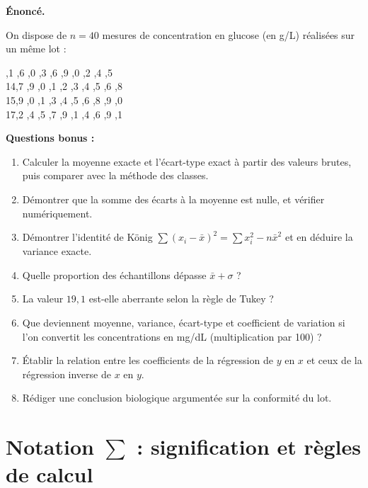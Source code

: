 \documentclass[11pt,a4paper]{article}
\newenvironment{enonce}
  {\par\medskip\begin{center}%
   \begin{lrbox}{\enoncebox}%
   \begin{minipage}{0.9\textwidth}%
   \textbf{Énoncé.}\ \itshape\par\smallskip}
  {\end{minipage}%
   \end{lrbox}%
   \setlength{\fboxsep}{10pt}%
   \colorbox{encadre}{\usebox{\enoncebox}}%
   \end{center}\par\medskip}
\begin{document}
\begin{enonce}
On dispose de \( n = 40 \) mesures de concentration en glucose
(en g/L) réalisées sur un même lot :

\smallskip
{},1 ,6 ,0 ,3 ,6 ,9 ,0 ,2 ,4 ,5 \\
14,7 ,9 ,0 ,1 ,2 ,3 ,4 ,5 ,6 ,8 \\
15,9 ,0 ,1 ,3 ,4 ,5 ,6 ,8 ,9 ,0 \\
17,2 ,4 ,5 ,7 ,9 ,1 ,4 ,6 ,9 ,1

\smallskip
\noindent\textbf{Questions bonus :}
\begin{enumerate}[label=\textbf{C.\arabic*.}, leftmargin=*]
  \item Calculer la moyenne exacte et l'écart-type exact à partir
        des valeurs brutes, puis comparer avec la méthode des classes.
  \item Démontrer que la somme des écarts à la moyenne est nulle,
        et vérifier numériquement.
  \item Démontrer l'identité de König
        \( \sum (x_i-\bar{x})^2 = \sum x_i^2 - n\bar{x}^2 \)
        et en déduire la variance exacte.
  \item Quelle proportion des échantillons dépasse
        \( \bar{x} + \sigma \) ?
  \item La valeur \( 19{,}1 \) est-elle aberrante selon la règle de Tukey ?
  \item Que deviennent moyenne, variance, écart-type et coefficient
        de variation si l'on convertit les concentrations en mg/dL
        (multiplication par 100) ?
  \item Établir la relation entre les coefficients de la régression
        de \( y \) en \( x \) et ceux de la régression inverse de
        \( x \) en \( y \).
  \item Rédiger une conclusion biologique argumentée sur la conformité
        du lot.
\end{enumerate}
\end{enonce}

\section{Notation \(\sum\) : signification et règles de calcul}
\end{document}
